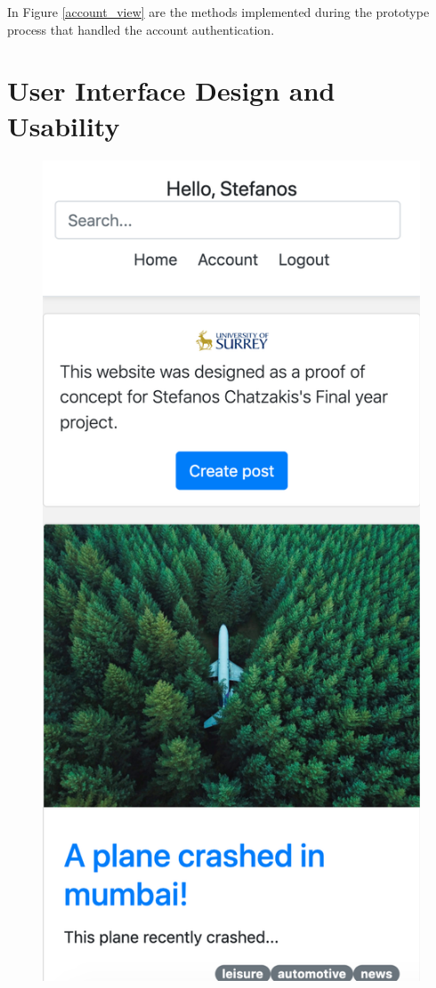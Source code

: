 In Figure \ref{account_view} are the methods implemented during the prototype process that handled the account authentication.

\section{User Interface Design and Usability}

\begin{figure}[htbp]
\begin{minipage}[t]{0.45\linewidth}
    \includegraphics[width=\linewidth]{Figures/home_mobile}

\end{minipage}
\end{figure}
